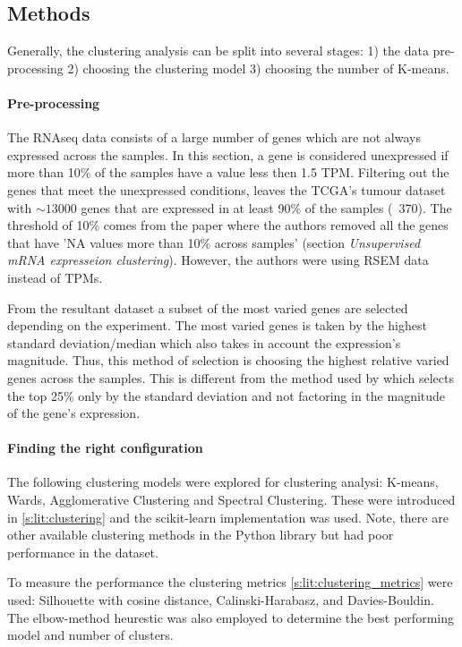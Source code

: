 

\subsection{Methods} \label{s:cs:methods}


Generally, the clustering analysis can be split into several stages: 1) the data pre-processing 2) choosing the clustering model 3) choosing the number of K-means.

\paragraph*{Pre-processing} \label{s:cs:pre-processing}
The RNAseq data consists of a large number of genes which are not always expressed across the samples. In this section, a gene is considered unexpressed if more than 10\% of the samples have a value less then 1.5 TPM. Filtering out the genes that meet the unexpressed conditions, leaves the TCGA's tumour dataset with $\sim13000$ genes that are expressed in at least 90\% of the samples (~370). The threshold of 10\% comes from the \citet{Robertson2017-mg} paper where the authors removed all the genes that have 'NA values more than 10\% across samples' (section \textit{Unsupervised mRNA expresseion clustering}). However, the authors were using RSEM data instead of TPMs.

From the resultant dataset a subset of the most varied genes are selected depending on the experiment. The most varied genes is taken by the highest standard deviation/median which also takes in account the expression's magnitude. Thus, this method of selection is choosing the highest relative varied genes across the samples. This is different from the method used by \citet{Robertson2017-mg} which selects the top 25\% only by the standard deviation and not factoring in the magnitude of the gene's expression.

\paragraph*{Finding the right configuration}

The following clustering models were explored for clustering analysi: K-means, Wards, Agglomerative Clustering and Spectral Clustering. These were introduced in \cref{s:lit:clustering} and the scikit-learn \cite{Scikit-learn_undated-ax} implementation was used. Note, there are other available clustering methods in the Python library but had poor performance in the dataset. 

To measure the performance the clustering metrics \cref{s:lit:clustering_metrics} were used: Silhouette with cosine distance, Calinski-Harabasz, and Davies-Bouldin. The elbow-method heurestic was also employed to determine the best performing model and number of clusters. 
